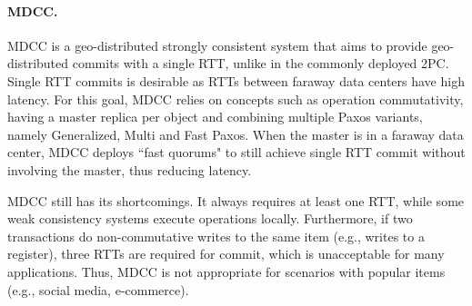 \paragraph{MDCC.} MDCC \cite{mdcc} is a geo-distributed strongly consistent system that aims to provide geo-distributed commits with a single RTT, unlike in the commonly deployed 2PC.
Single RTT commits is desirable as RTTs between faraway data centers have high latency.
For this goal, MDCC relies on concepts such as operation commutativity, having a master replica per object and combining multiple Paxos variants, namely Generalized, Multi and Fast Paxos.
When the master is in a faraway data center, MDCC deploys ``fast quorums" to still achieve single RTT commit without involving the master, thus reducing latency.

MDCC still has its shortcomings.
It always requires at least one RTT, while some weak consistency systems execute operations locally.
Furthermore, if two transactions do non-commutative writes to the same item (e.g., writes to a register), three RTTs are required for commit, which is unacceptable for many applications.
Thus, MDCC is not appropriate for scenarios with popular items (e.g., social media, e-commerce).


